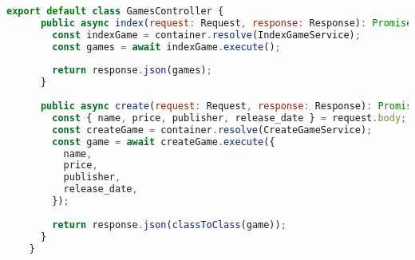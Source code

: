 \begin{lstlisting}[language=JavaScript, caption={GamesController.ts},captionpos=b, label=alg:gamescontroller]    
    export default class GamesController {
      public async index(request: Request, response: Response): Promise<Response> {
        const indexGame = container.resolve(IndexGameService);
        const games = await indexGame.execute();
    
        return response.json(games);
      }
    
      public async create(request: Request, response: Response): Promise<Response> {
        const { name, price, publisher, release_date } = request.body;
        const createGame = container.resolve(CreateGameService);
        const game = await createGame.execute({
          name,
          price,
          publisher,
          release_date,
        });
    
        return response.json(classToClass(game));
      }
    }    
\end{lstlisting}
